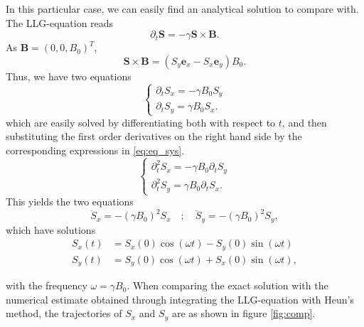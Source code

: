 In this particular case, we can easily find an analytical solution to compare with. The LLG-equation reads
\[
	\partial_t \mathbf{S} = -\gamma \mathbf{S} \times \mathbf{B}.
\]
As $\mathbf{B} = (0,0,B_0)^T$,
\[
	\mathbf{S} \times \mathbf{B} = (S_y \mathbf{e}_x - S_x \mathbf{e}_y) B_0.
\]
Thus, we have two equations 
\begin{equation}\label{eq:eq_sys}
	\begin{cases}
		\partial_t S_x = -\gamma B_0 S_y \\
		\partial_t S_y = \gamma B_0S_x.
	\end{cases}
\end{equation}
which are easily solved by differentiating both with respect to $t$, and then substituting the first order derivatives on the right hand side by the corresponding expressions in \ref{eq:eq_sys}.
\begin{equation}
	\begin{cases}
		\partial^2_t S_x = -\gamma B_0 \partial_t S_y  \\
		\partial^2_t S_y = \gamma B_0 \partial_t S_x.
	\end{cases}
\end{equation}
This yields the two equations
\begin{equation}
	\ddot{S}_x = - \left( \gamma B_0 \right)^2 S_x \quad;\quad \ddot{S}_y = - \left( \gamma B_0 \right)^2 S_y, 
\end{equation}
which have solutions 
\begin{align}
	S_x(t) &= S_x(0) \cos{(\omega t)} - S_y(0) \sin{(\omega t)} \label{eq:exact_1} \\
	S_y(t) &= S_y(0) \cos{(\omega t)} + S_x(0) \sin{(\omega t)} \label{eq:exact_2},
\end{align}

with the frequency $\omega = \gamma B_0$. When comparing the exact solution with the numerical estimate obtained through integrating the LLG-equation with Heun's method, the trajectories of $S_x$ and $S_y$ are as shown in figure \ref{fig:comp}.


